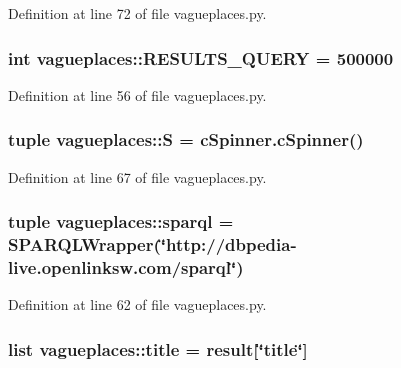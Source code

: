 \-Definition at line 72 of file vagueplaces.\-py.

\hypertarget{namespacevagueplaces_a07cd0ae682261d720780294aba9e03f4}{
\subsubsection[{\-R\-E\-S\-U\-L\-T\-S\-\_\-\-Q\-U\-E\-R\-Y}]{\setlength{\rightskip}{0pt plus 5cm}int {\bf vagueplaces\-::\-R\-E\-S\-U\-L\-T\-S\-\_\-\-Q\-U\-E\-R\-Y} = 500000}}\label{namespacevagueplaces_a07cd0ae682261d720780294aba9e03f4}


\-Definition at line 56 of file vagueplaces.\-py.

\hypertarget{namespacevagueplaces_a62d09a13c6d9f03428f5a6992dd10644}{
\subsubsection[{\-S}]{\setlength{\rightskip}{0pt plus 5cm}tuple {\bf vagueplaces\-::\-S} = {\bf c\-Spinner.\-c\-Spinner}()}}\label{namespacevagueplaces_a62d09a13c6d9f03428f5a6992dd10644}


\-Definition at line 67 of file vagueplaces.\-py.

\hypertarget{namespacevagueplaces_a327d24ca861ef2c176f7c29da06d2da8}{
\subsubsection[{sparql}]{\setlength{\rightskip}{0pt plus 5cm}tuple {\bf vagueplaces\-::sparql} = \-S\-P\-A\-R\-Q\-L\-Wrapper(\char`\"{}http\-://dbpedia-\/live.\-openlinksw.\-com/{\bf sparql}\char`\"{})}}\label{namespacevagueplaces_a327d24ca861ef2c176f7c29da06d2da8}


\-Definition at line 62 of file vagueplaces.\-py.

\hypertarget{namespacevagueplaces_a967dc293801b4684884a9841274c9591}{
\subsubsection[{title}]{\setlength{\rightskip}{0pt plus 5cm}list {\bf vagueplaces\-::title} = result\mbox{[}\char`\"{}title\char`\"{}\mbox{]}}}\label{namespacevagueplaces_a967dc293801b4684884a9841274c9591}


